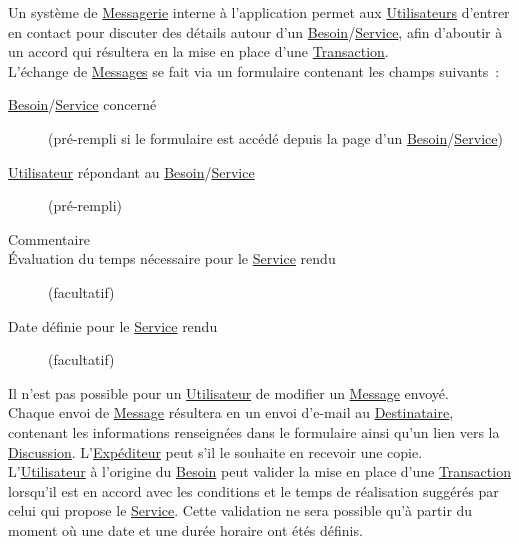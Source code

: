 \documentclass[french,12pt]{article}
\begin{document}
			Un système de \hyperlink{messagerie}{Messagerie} interne à l’application
			 permet aux \hyperlink{utilisateur}{Utilisateurs} d’entrer en contact pour
			 discuter des détails autour d’un
			 \hyperlink{besoin}{Besoin}/\hyperlink{service}{Service}, afin d’aboutir à
			 un accord qui résultera en la mise en place d’une
			 \hyperlink{transaction}{Transaction}.\\

			L’échange de \hyperlink{message}{Messages} se fait via un formulaire
			 contenant les champs suivants :
			\begin{description}
				\item [\hyperlink{besoin}{Besoin}/\hyperlink{service}{Service} concerné]
					(pré-rempli si le formulaire est accédé depuis la page d’un
					 \hyperlink{besoin}{Besoin}/\hyperlink{service}{Service})
				\item [\hyperlink{utilisateur}{Utilisateur} répondant au \hyperlink{besoin}{Besoin}/\hyperlink{service}{Service}]
					(pré-rempli)
				\item [Commentaire]
				\item [Évaluation du temps nécessaire pour le \hyperlink{service}{Service} rendu]
					(facultatif)
				\item [Date définie pour le \hyperlink{service}{Service} rendu]
					(facultatif)
			\end{description}

			Il n’est pas possible pour un \hyperlink{utilisateur}{Utilisateur} de
			 modifier un \hyperlink{message}{Message} envoyé.\\

			Chaque envoi de \hyperlink{message}{Message} résultera en un envoi
			 d’e-mail au \hyperlink{destinataire}{Destinataire}, contenant les
			 informations renseignées dans le formulaire ainsi qu’un lien vers la
			 \hyperlink{discussion}{Discussion}. L’\hyperlink{expediteur}{Expéditeur}
			 peut s’il le souhaite en recevoir une copie.\\

			L’\hyperlink{utilisateur}{Utilisateur} à l’origine du
			 \hyperlink{besoin}{Besoin} peut valider la mise en place d’une
			 \hyperlink{transaction}{Transaction} lorsqu’il est en accord avec les
			 conditions et le temps de réalisation suggérés par celui qui propose le
			 \hyperlink{service}{Service}. Cette validation ne sera possible qu’à
			 partir du moment où une date et une durée horaire ont étés définis.\\
\end{document}
